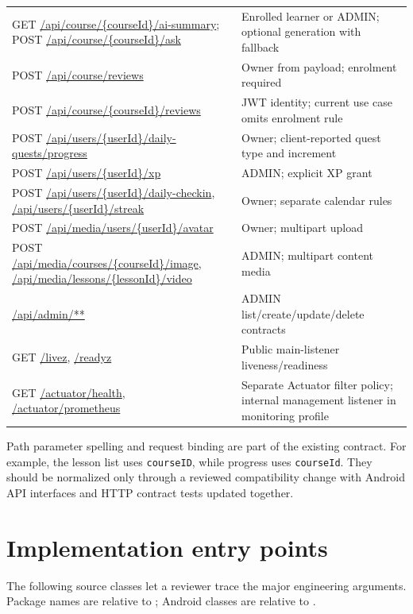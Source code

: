\documentclass[12pt,a4paper,oneside]{report}
\begin{document}
\begin{longtable}{P{0.44\textwidth}P{0.45\textwidth}}
GET \url{/api/course/{courseId}/ai-summary}; POST \url{/api/course/{courseId}/ask} & Enrolled learner or ADMIN; optional generation with fallback\\
POST \url{/api/course/reviews} & Owner from payload; enrolment required\\
POST \url{/api/course/{courseId}/reviews} & JWT identity; current use case omits enrolment rule\\
POST \url{/api/users/{userId}/daily-quests/progress} & Owner; client-reported quest type and increment\\
POST \url{/api/users/{userId}/xp} & ADMIN; explicit XP grant\\
POST \url{/api/users/{userId}/daily-checkin}, \url{/api/users/{userId}/streak} & Owner; separate calendar rules\\
POST \url{/api/media/users/{userId}/avatar} & Owner; multipart upload\\
POST \url{/api/media/courses/{courseId}/image}, \url{/api/media/lessons/{lessonId}/video} & ADMIN; multipart content media\\
\url{/api/admin/**} & ADMIN list/create/update/delete contracts\\
GET \url{/livez}, \url{/readyz} & Public main-listener liveness/readiness\\
GET \url{/actuator/health}, \url{/actuator/prometheus} & Separate Actuator filter policy; internal management listener in monitoring profile\\
\bottomrule
\end{longtable}

Path parameter spelling and request binding are part of the existing contract.
For example, the lesson list uses \texttt{courseID}, while progress uses
\texttt{courseId}. They should be normalized only through a reviewed compatibility
change with Android API interfaces and HTTP contract tests updated together.

\section{Implementation entry points}
The following source classes let a reviewer trace the major engineering arguments.
Package names are relative to ; Android
classes are relative to .
\end{document}
